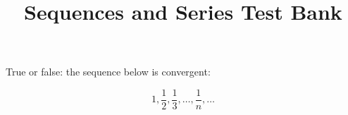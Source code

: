 \documentclass[10pt]{exam}
\title{Sequences and Series Test Bank}
\date{}
\begin{document}
\maketitle

\begin{questions}

\question  True or false: the sequence below is convergent:

$$1, \frac{1}{2}, \frac{1}{3}, \ldots, \frac{1}{n}, \ldots$$


\end{questions}
\end{document}
